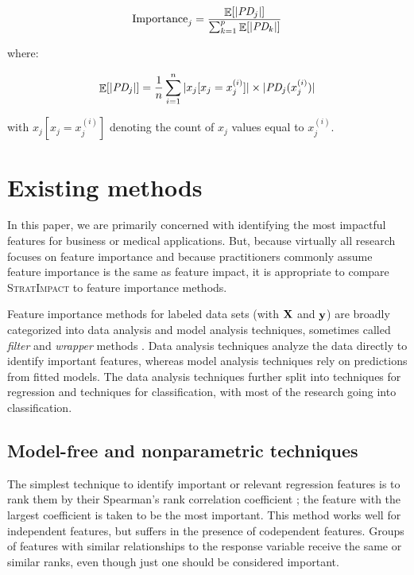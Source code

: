\documentclass[11pt]{article}
\DeclareMathOperator{\Ex}{\mathbb{E}}
\newcommand{\simp}{\fontfamily{cmr}\textsc{\small StratImpact}}
\begin{document}
\begin{equation}\label{eq:Epd2b}
\text{Importance}_j = \frac{\Ex[|\text{\it PD}_j|]}{\sum_{k=1}^p \Ex[|\text{\it PD}_k|]}
\end{equation}

\noindent where:

\begin{equation}\label{eq:Epd2c}
\Ex[|\text{\it PD}_j|] = \frac{1}{n} \sum_{i=1}^{n} |x_j[x_j=x_j^{(i)}]| \times  |\text{\it PD}_j(x_j^{(i)})|
\end{equation}

\noindent with $x_j[x_j=x_j^{(i)}]$ denoting the count of $x_j$ values equal to $x_j^{(i)}$.

\section{Existing methods}\label{sec:existing}

In this paper, we are primarily concerned with identifying the most impactful features for business or medical applications. But, because virtually all research focuses on feature importance and because practitioners commonly assume feature importance is the same as feature impact, it is appropriate to compare \simp{} to  feature importance methods.

Feature importance methods for labeled data sets (with $\bf X$ and $\bf y$) are broadly categorized into data analysis and model analysis techniques, sometimes called {\em filter} and {\em wrapper} methods \citep{tsanas}. Data analysis techniques analyze the data directly to identify important features, whereas model analysis techniques rely on predictions from fitted models.  The data analysis techniques further split into techniques for regression and techniques for classification, with most of the research going into classification.

\subsection{Model-free and nonparametric techniques}

The simplest technique to identify important or relevant regression features is to rank them by their Spearman's rank correlation coefficient \citep{spearmans}; the feature with the largest coefficient is taken to be the most important. This method works well for independent features, but suffers in the presence of codependent features.   Groups of features with similar relationships to the response variable receive the same or similar ranks, even though just one should be considered important.
\end{document}
